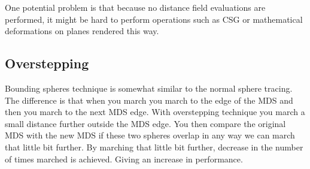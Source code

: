 			One potential problem is that because no distance field evaluations 
			are performed, it might be hard to perform operations such as CSG or
			mathematical deformations on planes rendered this way.

		\subsection{Overstepping}

			Bounding spheres technique is somewhat similar to the normal sphere
			tracing. The difference is that when you march you march to the
			edge of the MDS and then you march to the next MDS edge. With
			overstepping technique you march a small distance further
			outside the MDS edge. You then compare the original MDS with the
			new MDS if these two spheres overlap in any way we can march that
			little bit further. By marching that little bit further, decrease
			in the number of times marched is achieved. Giving an increase in
			performance. 
			
